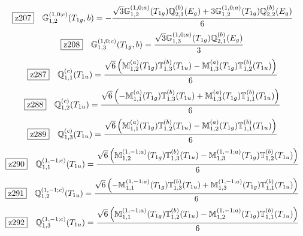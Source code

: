 \documentclass[fleqn,10pt,landscape]{jsarticle}
\begin{document}
\begin{dmath*}
\hspace*{3mm}\fbox{z207}\quad \mathbb{G}_{1,2}^{(1,0;c)}(T_{1g},b)=- \frac{\sqrt{3} \mathbb{G}_{1,2}^{(1,0;a)}(T_{1g}) \mathbb{Q}_{2,1}^{(b)}(E_{g}) + 3 \mathbb{G}_{1,2}^{(1,0;a)}(T_{1g}) \mathbb{Q}_{2,2}^{(b)}(E_{g})}{6}
\end{dmath*}
\begin{dmath*}
\hspace*{3mm}\fbox{z208}\quad \mathbb{G}_{1,3}^{(1,0;c)}(T_{1g},b)=\frac{\sqrt{3} \mathbb{G}_{1,3}^{(1,0;a)}(T_{1g}) \mathbb{Q}_{2,1}^{(b)}(E_{g})}{3}
\end{dmath*}
\begin{dmath*}
\hspace*{3mm}\fbox{z287}\quad \mathbb{Q}_{1,1}^{(c)}(T_{1u})=\frac{\sqrt{6} \left(\mathbb{M}_{1,2}^{(a)}(T_{1g}) \mathbb{T}_{1,3}^{(b)}(T_{1u}) - \mathbb{M}_{1,3}^{(a)}(T_{1g}) \mathbb{T}_{1,2}^{(b)}(T_{1u})\right)}{6}
\end{dmath*}
\begin{dmath*}
\hspace*{3mm}\fbox{z288}\quad \mathbb{Q}_{1,2}^{(c)}(T_{1u})=\frac{\sqrt{6} \left(- \mathbb{M}_{1,1}^{(a)}(T_{1g}) \mathbb{T}_{1,3}^{(b)}(T_{1u}) + \mathbb{M}_{1,3}^{(a)}(T_{1g}) \mathbb{T}_{1,1}^{(b)}(T_{1u})\right)}{6}
\end{dmath*}
\begin{dmath*}
\hspace*{3mm}\fbox{z289}\quad \mathbb{Q}_{1,3}^{(c)}(T_{1u})=\frac{\sqrt{6} \left(\mathbb{M}_{1,1}^{(a)}(T_{1g}) \mathbb{T}_{1,2}^{(b)}(T_{1u}) - \mathbb{M}_{1,2}^{(a)}(T_{1g}) \mathbb{T}_{1,1}^{(b)}(T_{1u})\right)}{6}
\end{dmath*}
\begin{dmath*}
\hspace*{3mm}\fbox{z290}\quad \mathbb{Q}_{1,1}^{(1,-1;c)}(T_{1u})=\frac{\sqrt{6} \left(\mathbb{M}_{1,2}^{(1,-1;a)}(T_{1g}) \mathbb{T}_{1,3}^{(b)}(T_{1u}) - \mathbb{M}_{1,3}^{(1,-1;a)}(T_{1g}) \mathbb{T}_{1,2}^{(b)}(T_{1u})\right)}{6}
\end{dmath*}
\begin{dmath*}
\hspace*{3mm}\fbox{z291}\quad \mathbb{Q}_{1,2}^{(1,-1;c)}(T_{1u})=\frac{\sqrt{6} \left(- \mathbb{M}_{1,1}^{(1,-1;a)}(T_{1g}) \mathbb{T}_{1,3}^{(b)}(T_{1u}) + \mathbb{M}_{1,3}^{(1,-1;a)}(T_{1g}) \mathbb{T}_{1,1}^{(b)}(T_{1u})\right)}{6}
\end{dmath*}
\begin{dmath*}
\hspace*{3mm}\fbox{z292}\quad \mathbb{Q}_{1,3}^{(1,-1;c)}(T_{1u})=\frac{\sqrt{6} \left(\mathbb{M}_{1,1}^{(1,-1;a)}(T_{1g}) \mathbb{T}_{1,2}^{(b)}(T_{1u}) - \mathbb{M}_{1,2}^{(1,-1;a)}(T_{1g}) \mathbb{T}_{1,1}^{(b)}(T_{1u})\right)}{6}
\end{dmath*}
\end{document}
